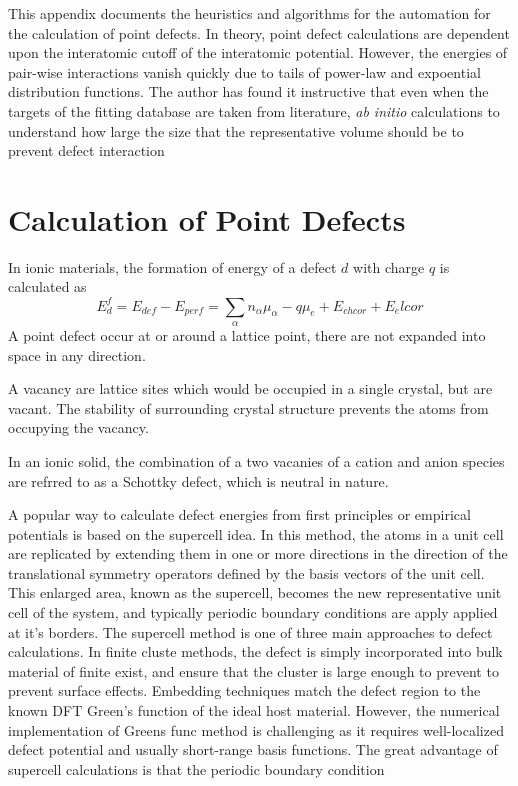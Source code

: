 
This appendix documents the heuristics and algorithms for the automation for the calculation of point defects.
In theory, point defect calculations are dependent upon the interatomic cutoff of the interatomic potential.
However, the energies of pair-wise interactions vanish quickly due to tails of power-law and expoential distribution functions.
The author has found it instructive that even when the targets of the fitting database are taken from literature, \emph{ab initio} calculations to understand how large the size that the representative volume should be to prevent defect interaction
\section{Calculation of Point Defects}
In ionic materials, the formation of energy of a defect $d$ with charge $q$ is calculated as
\begin{equation}
  E_d^f=E_{def}-E_{perf}=\sum_\alpha n_\alpha \mu_\alpha - q\mu_e + E_{chcor} + E_elcor
\end{equation}
A point defect occur at or around a lattice point, there are not expanded into space in any direction.

A vacancy are lattice sites which would be occupied in a single crystal, but are vacant.  The stability of surrounding crystal structure prevents the atoms from occupying the vacancy.

In an ionic solid, the combination of a two vacanies of a cation and anion species are refrred to as a Schottky defect, which is neutral in nature.

A popular way to calculate defect energies from first principles or empirical potentials is based on the supercell idea.
In this method, the atoms in a unit cell are replicated by extending them in one or more directions in the direction of the translational symmetry operators defined by the basis vectors of the unit cell.
This enlarged area, known as the supercell, becomes the new representative unit cell of the system, and typically periodic boundary conditions are apply applied at it's borders.
The supercell method is one of three main approaches to defect calculations.  In finite cluste methods, the defect is simply incorporated into bulk material of finite exist, and ensure that the cluster is large enough to prevent to prevent surface effects.
Embedding techniques match the defect region to the known DFT Green's function of the ideal host material.  However, the numerical implementation of Greens func method is challenging as it requires well-localized defect potential and usually short-range basis functions.  The great advantage of supercell calculations is that the periodic boundary condition

